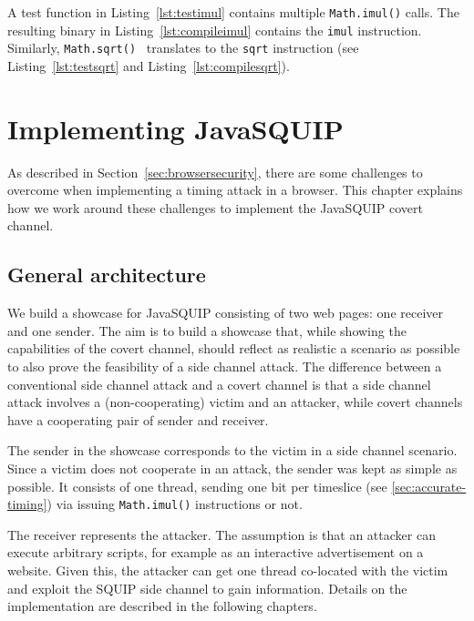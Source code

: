 \documentclass[11pt,
  titlepage=false,
  parskip=half,      %
]{scrreprt}
\begin{document}
A test function in Listing~\ref{lst:testimul} contains multiple \texttt{Math.imul()} calls.
The resulting binary in Listing~\ref{lst:compileimul} contains the \texttt{imul} instruction.
Similarly, \texttt{Math.sqrt()}~\cite{mathsqrt} translates to the \texttt{sqrt} instruction (see Listing~\ref{lst:testsqrt} and Listing~\ref{lst:compilesqrt}).

\chapter{Implementing JavaSQUIP}
\label{ch:implementation}
As described in Section~\ref{sec:browsersecurity}, there are some challenges to overcome when implementing a timing attack in a browser.
This chapter explains how we work around these challenges to implement the JavaSQUIP covert channel.

\section{General architecture}
\label{sec:general-architecture}
We build a showcase for JavaSQUIP consisting of two web pages: one receiver and one sender.
The aim is to build a showcase that, while showing the capabilities of the covert channel,
should reflect as realistic a scenario as possible to also prove the feasibility of a side channel attack.
The difference between a conventional side channel attack and a covert channel is that a side channel attack involves a (non-cooperating) victim and
an attacker, while covert channels have a cooperating pair of sender and receiver.

The sender in the showcase corresponds to the victim in a side channel scenario.
Since a victim does not cooperate in an attack, the sender was kept as simple as possible.
It consists of one thread, sending one bit per timeslice (see \ref{sec:accurate-timing}) via issuing \texttt{Math.imul()} instructions or not.

The receiver represents the attacker.
The assumption is that an attacker can execute arbitrary scripts, for example as an interactive advertisement on a website.
Given this, the attacker can get one thread co-located with the victim and exploit the SQUIP side channel to gain information.
Details on the implementation are described in the following chapters.
\end{document}
